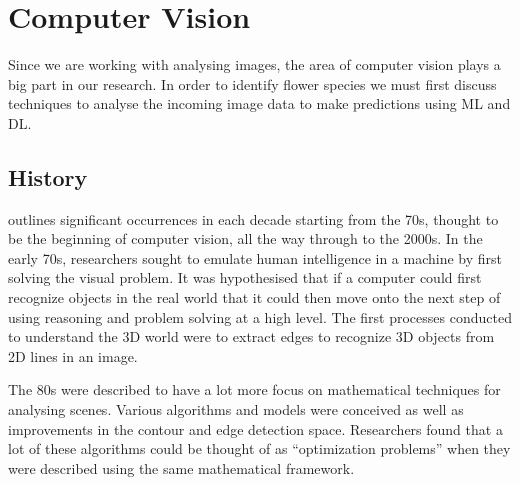 \documentclass[12pt,a4paper]{report}
\begin{document}
\section{Computer Vision}

Since we are working with analysing images, the area of computer vision plays a big part in our research. In order to 
identify flower species we must first discuss techniques to analyse the incoming image data to make predictions using
ML and DL.

\subsection{History}

\citet{SzeliskiRichard2011CV:A} outlines significant occurrences in each decade starting from the 70s, 
thought to be the beginning of computer vision, all the way through to the 2000s. In the early 70s, researchers sought 
to emulate human intelligence in a machine by first solving the visual problem. It was hypothesised that if a computer 
could first recognize objects in the real world that it could then move onto the next step of using reasoning and 
problem solving at a high level. The first processes conducted to understand the 3D world were to extract edges to 
recognize 3D objects from 2D lines in an image.

\par

The 80s were described to have a lot more focus on mathematical techniques for analysing scenes. Various algorithms 
and models were conceived as well as improvements in the contour and edge detection space. Researchers found that a 
lot of these algorithms could be thought of as “optimization problems” when they were described using the same 
mathematical framework.

\par
\end{document}
